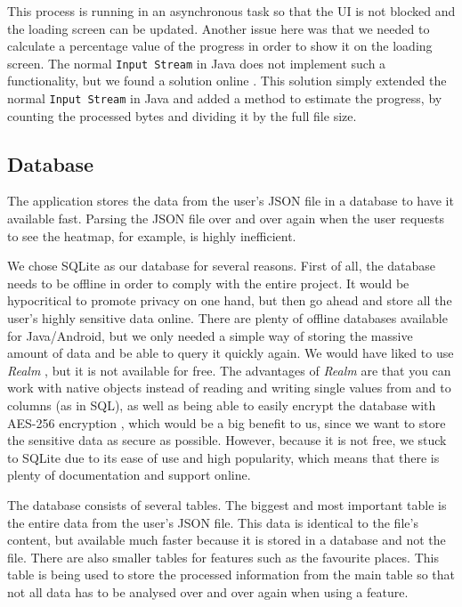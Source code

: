 \documentclass[12p]{article}
\begin{document}
            This process is running in an asynchronous task so that the UI is not blocked and the loading screen can be updated. Another issue here was that we needed to calculate a percentage value of the progress in order to show it on the loading screen. The normal \texttt{Input Stream} in Java does not implement such a functionality, but we found a solution online \cite{ProgressInputStream}. This solution simply extended the normal \texttt{Input Stream} in Java and added a method to estimate the progress, by counting the processed bytes and dividing it by the full file size.
            
            \subsection{Database}
            
            The application stores the data from the user's JSON file in a database to have it available fast. Parsing the JSON file over and over again when the user requests to see the heatmap, for example, is highly inefficient.
            
            We chose SQLite as our database for several reasons. First of all, the database needs to be offline in order to comply with the entire project. It would be hypocritical to promote privacy on one hand, but then go ahead and store all the user's highly sensitive data online. There are plenty of offline databases available for Java/Android, but we only needed a simple way of storing the massive amount of data and be able to query it quickly again. We would have liked to use \textit{Realm} \cite{Realm}, but it is not available for free. The advantages of \textit{Realm} are that you can work with native objects instead of reading and writing single values from and to columns (as in SQL), as well as being able to easily encrypt the database with AES-256 encryption \cite{RealmFeatures}, which would be a big benefit to us, since we want to store the sensitive data as secure as possible. However, because it is not free, we stuck to SQLite due to its ease of use and high popularity, which means that there is plenty of documentation and support online.
            
            The database consists of several tables. The biggest and most important table is the entire data from the user's JSON file. This data is identical to the file's content, but available much faster because it is stored in a database and not the file. There are also smaller tables for features such as the favourite places. This table is being used to store the processed information from the main table so that not all data has to be analysed over and over again when using a feature.
            
\end{document}
